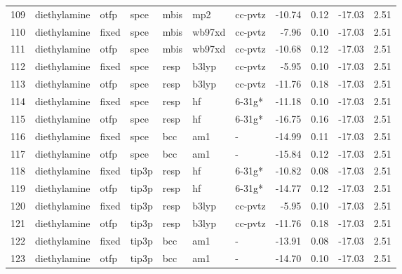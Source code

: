\begin{tabular}{lllllllrrrr}
109 &                  diethylamine &   otfp &   spce &   mbis &     mp2 &      cc-pvtz &      -10.74 &     0.12 &      -17.03 &      2.51 \\
110 &                  diethylamine &  fixed &   spce &   mbis &  wb97xd &      cc-pvtz &       -7.96 &     0.10 &      -17.03 &      2.51 \\
111 &                  diethylamine &   otfp &   spce &   mbis &  wb97xd &      cc-pvtz &      -10.68 &     0.12 &      -17.03 &      2.51 \\
112 &                  diethylamine &  fixed &   spce &   resp &   b3lyp &      cc-pvtz &       -5.95 &     0.10 &      -17.03 &      2.51 \\
113 &                  diethylamine &   otfp &   spce &   resp &   b3lyp &      cc-pvtz &      -11.76 &     0.18 &      -17.03 &      2.51 \\
114 &                  diethylamine &  fixed &   spce &   resp &      hf &       6-31g* &      -11.18 &     0.10 &      -17.03 &      2.51 \\
115 &                  diethylamine &   otfp &   spce &   resp &      hf &       6-31g* &      -16.75 &     0.16 &      -17.03 &      2.51 \\
116 &                  diethylamine &  fixed &   spce &    bcc &     am1 &            - &      -14.99 &     0.11 &      -17.03 &      2.51 \\
117 &                  diethylamine &   otfp &   spce &    bcc &     am1 &            - &      -15.84 &     0.12 &      -17.03 &      2.51 \\
118 &                  diethylamine &  fixed &  tip3p &   resp &      hf &       6-31g* &      -10.82 &     0.08 &      -17.03 &      2.51 \\
119 &                  diethylamine &   otfp &  tip3p &   resp &      hf &       6-31g* &      -14.77 &     0.12 &      -17.03 &      2.51 \\
120 &                  diethylamine &  fixed &  tip3p &   resp &   b3lyp &      cc-pvtz &       -5.95 &     0.10 &      -17.03 &      2.51 \\
121 &                  diethylamine &   otfp &  tip3p &   resp &   b3lyp &      cc-pvtz &      -11.76 &     0.18 &      -17.03 &      2.51 \\
122 &                  diethylamine &  fixed &  tip3p &    bcc &     am1 &            - &      -13.91 &     0.08 &      -17.03 &      2.51 \\
123 &                  diethylamine &   otfp &  tip3p &    bcc &     am1 &            - &      -14.70 &     0.10 &      -17.03 &      2.51 \\

\end{tabular}
